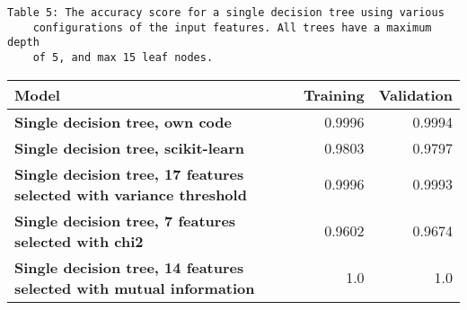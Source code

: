 \documentclass[11pt]{article}
\begin{document}
\begin{Verbatim}[commandchars=\\\{\}]
	Table 5: The accuracy score for a single decision tree using various
	configurations of the input features. All trees have a maximum depth 
	of 5, and max 15 leaf nodes.
\end{Verbatim}
\begin{table}[h!]
	\begin{center}
		\label{tab:table1}
		\begin{tabular}{l|r|r}
			\textbf{Model}                                                      		   & \textbf{Training} & \textbf{Validation}
			\\ \hline
			\textbf{Single decision tree, own code}                                        & 0.9996        & 0.9994              \\ \hline
			\textbf{Single decision tree, scikit-learn}                                    & 0.9803        & 0.9797              \\ \hline
			\textbf{Single decision tree, 17 features selected with variance threshold}    & 0.9996        & 0.9993              \\ \hline
			\textbf{Single decision tree, 7 features selected with chi2}                   & 0.9602        & 0.9674              \\ \hline
			\textbf{Single decision tree, 14 features selected with mutual information}    & 1.0           & 1.0                \\ \hline
		\end{tabular}
	\end{center}
\end{table}
\end{document}
